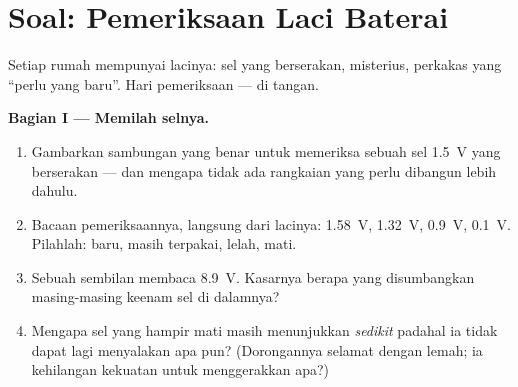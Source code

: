 \section{Soal: Pemeriksaan Laci Baterai}

\begin{problem}\label{pb:g8:voltage-voltmeter:1}
Setiap rumah mempunyai lacinya: sel yang berserakan, 
misterius, perkakas yang ``perlu yang baru''. Hari pemeriksaan ---
 di tangan.

\medskip\noindent\textbf{Bagian I --- Memilah selnya.}
\begin{enumerate}
  \item Gambarkan sambungan  yang benar untuk memeriksa
        sebuah sel \qty{1.5}{V} yang berserakan --- dan mengapa tidak
        ada rangkaian yang perlu dibangun lebih dahulu.
  \item Bacaan pemeriksaannya, langsung dari lacinya:
        \qty{1.58}{V}, \qty{1.32}{V}, \qty{0.9}{V},
        \qty{0.1}{V}. Pilahlah: baru, masih terpakai, lelah, mati.
  \item Sebuah  sembilan  membaca \qty{8.9}{V}. Kasarnya
        berapa yang disumbangkan masing-masing keenam sel di dalamnya?
  \item Mengapa sel yang hampir mati masih menunjukkan \emph{sedikit}
         padahal ia tidak dapat lagi menyalakan apa pun?
        (Dorongannya selamat dengan lemah; ia kehilangan kekuatan
        untuk menggerakkan apa?)
\end{enumerate}


\end{problem}
